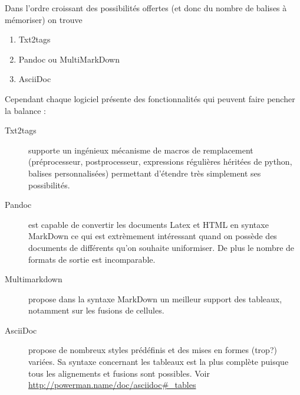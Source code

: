 \documentclass[12pt]{article}
\begin{document}
Dans l'ordre croissant des possibilités offertes (et donc du nombre de
balises à mémoriser) on trouve

\begin{enumerate}[1.]
\item
  Txt2tags
\item
  Pandoc ou MultiMarkDown
\item
  AsciiDoc
\end{enumerate}
Cependant chaque logiciel présente des fonctionnalités qui peuvent faire
pencher la balance :

\begin{description}
\item[Txt2tags]
supporte un ingénieux mécanisme de macros de remplacement
(préprocesseur, postprocesseur, expressions régulières héritées de
python, balises personnalisées) permettant d'étendre très simplement ses
possibilités.

\item[Pandoc]
est capable de convertir les documents Latex et HTML en syntaxe MarkDown
ce qui est extrèmement intéressant quand on possède des documents de
différents qu'on souhaite uniformiser. De plus le nombre de formats de
sortie est incomparable.

\item[Multimarkdown]
propose dans la syntaxe MarkDown un meilleur support des tableaux,
notamment sur les fusions de cellules.

\item[AsciiDoc]
propose de nombreux styles prédéfinis et des mises en formes (trop?)
variées. Sa syntaxe concernant les tableaux est la plus complète puisque
tous les alignements et fusions sont possibles. Voir
\url{http://powerman.name/doc/asciidoc#_tables}

\end{description}
\end{document}
